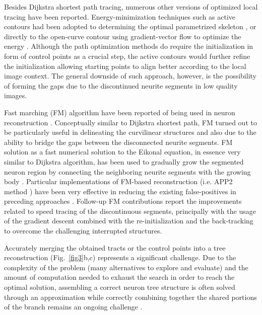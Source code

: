 Besides Dijkstra shortest path tracing, numerous other versions of optimized local tracing have been reported. Energy-minimization techniques such as active contours had been adopted to determining the optimal parametrized skeleton \cite{schmitt2004new}, or directly to the open-curve contour using gradient-vector flow to optimize the energy \cite{wang2011broadly}. Although the path optimization methods do require the initialization in form of control points as a crucial step, the active contours would further refine the initialization allowing starting points to align better according to the local image context. The general downside of such approach, however, is the possibility of forming the gaps due to the discontinued neurite segments in low quality images. 

Fast marching (FM) algorithm \cite{sethian1999level} have been reported of being used in neuron reconstruction \cite{xiao2013app2,  peng2011automatic, mukherjee2012automated, van2007subvoxel, santamaria2015automatic, basu2014reconstructing}. Conceptually similar to Dijkstra shortest path, FM turned out to be particularly useful in delineating the curvilinear structures and also due to the ability to bridge the gaps between the disconnected neurite segments. FM solution as a fast numerical solution to the Eikonal equation, in essence very similar to Dijkstra algorithm, has been used to gradually grow the segmented neuron region by connecting the neighboring neurite segments with the growing body \cite{peng2011automatic}. Particular implementations of FM-based reconstruction (i.e. APP2 method \cite{xiao2013app2}) have been very effective in reducing the existing false-positives in preceding approaches \cite{van2007subvoxel, peng2011automatic}. Follow-up FM contributions report the improvements related to speed tracing of the discontinuous segments, principally with the usage of the gradient descent combined with the re-initialization \cite{mukherjee2012automated} and the back-tracking \cite{liu2016rivulet} to overcome the challenging interrupted structures.  

Accurately merging the obtained tracts or the control points into a tree reconstruction (Fig.~\ref{fig3}b,c) represents a significant challenge. Due to the complexity of the problem (many alternatives to explore and evaluate) and the amount of computation needed to exhaust the search in order to reach the optimal solution, assembling a correct neuron tree structure is often solved through an approximation while correctly combining together the shared portions of the branch remains an ongoing challenge \cite{peng2015bigneuron}.

